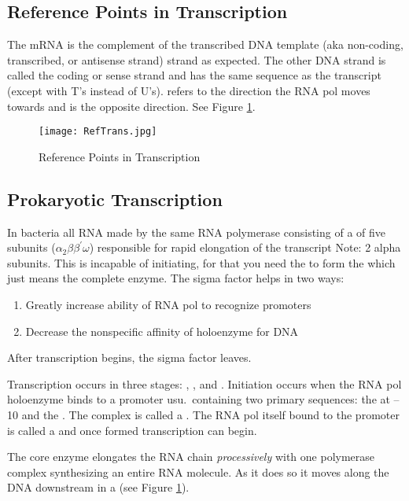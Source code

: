 \documentclass[../Bio_chemistryReview.tex]{subfiles}
\begin{document}
\subsection{Reference Points in Transcription}
The mRNA is the complement of the transcribed DNA template (aka non-coding,
transcribed, or antisense strand) strand as expected. The other DNA strand is
called the coding or sense strand and has the same sequence as the transcript
(except with T's instead of U's).  refers to the direction
the RNA pol moves towards and  is the opposite direction. See
Figure \ref{fig:refPoints}.
\begin{figure}[H]
  \centering
  \texttt{[image: RefTrans.jpg]}
  \caption{Reference Points in Transcription}
  \label{fig:refPoints}
\end{figure}

\subsection{Prokaryotic Transcription}
In bacteria all RNA made by the same RNA polymerase consisting of a
 of five subunits ($ \alpha_{2}\beta\beta^{\prime}\omega $)
responsible for rapid elongation of the transcript Note: 2 alpha subunits. This
is incapable of initiating, for that you need the  to form
the  which just means the complete enzyme. The sigma factor
helps in two ways:
\begin{enumerate}
  \item Greatly increase ability of RNA pol to recognize promoters
  \item Decrease the nonspecific affinity of holoenzyme for DNA
\end{enumerate}
After transcription begins, the sigma factor leaves.\par

Transcription occurs in three stages: ,
, and . Initiation occurs when the RNA
pol holoenzyme binds to a promoter usu.\ containing two primary sequences: the
 at --10 and the . The complex is
called a . The RNA pol itself bound to the promoter is
called a  and once formed transcription can begin.\par

The core enzyme elongates the RNA chain \textit{processively} with one
polymerase complex synthesizing an entire RNA molecule. As it does so it moves
along the DNA downstream in a  (see Figure
\ref{fig:refPoints}).
\end{document}
